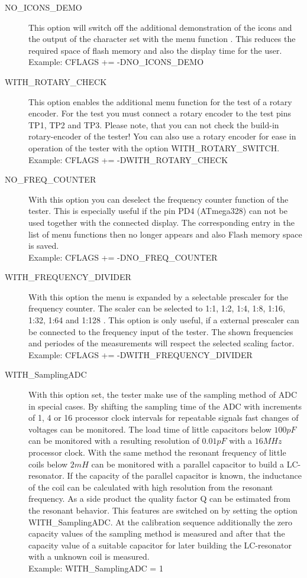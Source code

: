\begin{description}
 \item[NO\_ICONS\_DEMO]
This option will switch off the additional demonstration of the icons and the output of the character set with
the menu function .
This reduces the required space of flash memory  and also the display time for the user.\\
Example: CFLAGS += -DNO\_ICONS\_DEMO

 \item[WITH\_ROTARY\_CHECK]
This option enables the additional menu function for the test of a rotary encoder.
For the test you must connect a rotary encoder to the test pins TP1, TP2 and TP3.
Please note, that you can not check the build-in rotary-encoder of the tester!
You can also use a rotary encoder for ease in operation of the tester with the option WITH\_ROTARY\_SWITCH.\\
Example: CFLAGS += -DWITH\_ROTARY\_CHECK

 \item[NO\_FREQ\_COUNTER]
With this option you can deselect the frequency counter function of the tester.
This is especially useful if the pin PD4 (ATmega328) can not be used together with the
connected display.
The corresponding entry in the list of menu functions then no longer appears and also
Flash memory space is saved.\\
Example: CFLAGS += -DNO\_FREQ\_COUNTER

 \item[WITH\_FREQUENCY\_DIVIDER]
With this option the menu is expanded by a selectable prescaler for the frequency counter.
The scaler can be selected to 1:1, 1:2, 1:4, 1:8, 1:16, 1:32, 1:64 and 1:128 .
This option is only useful, if a external prescaler can be connected to the frequency input of the tester.
The shown frequencies and periodes of the measurements will respect the selected scaling factor.\\
Example: CFLAGS += -DWITH\_FREQUENCY\_DIVIDER

  \item[WITH\_SamplingADC] With this option set, the tester make use of the sampling method of ADC in special cases.
By shifting the sampling time of the ADC with increments of 1, 4 or 16 processor clock intervals for repeatable signals
fast changes of voltages can be monitored.
The load time of little capacitors below \(100pF\) can be monitored with a resulting resolution of \(0.01pF\) with a \(16MHz\) processor clock.
With the same method the resonant frequency of little coils below \(2mH\) can be monitored with a parallel capacitor to build a LC-resonator.
If the capacity of the parallel capacitor is known, the inductance of the coil can be calculated with high resolution from
the resonant frequency. As a side product the quality factor Q can be estimated from the resonant behavior.
This features are switched on by setting the option WITH\_SamplingADC.
At the calibration sequence additionally the zero capacity values of the sampling method is measured and
after that the capacity value of a suitable capacitor for later building the LC-resonator with a unknown coil is measured.\\
Example: WITH\_SamplingADC = 1


\end{description}
